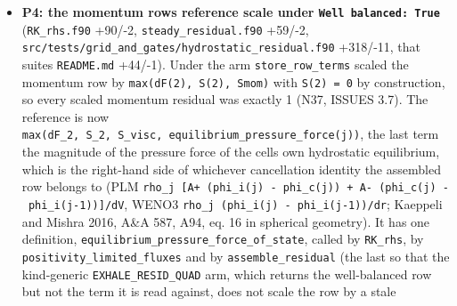 \documentclass[english,a4paper]{my_memo}
\begin{document}
\begin{itemize}
  \texttt{info\ =\ 0} log with no statement that the stop test read the certified rows;
  a refusal at return with no stop statement) and GREEN after;
  \texttt{certification} 57/0, \texttt{carrier\_returned\_state\_acceptance} 37/0,
  \texttt{attempted\_step} 71/0 unchanged. Impact: the \texttt{wasp\_full\_newton} reload ends
  \texttt{info\ =\ 0}, \texttt{\textbar{}\textbar{}R\textbar{}\textbar{}} 1.667e-09, flux spread 6.233e-14, 8 outer iterations,
  \texttt{log10\ Mdot} 13.30 on both binaries, the certification block line for line
  identical, every output byte-identical but the provenance line of the two
  \texttt{Hydro\_ioniz*} files and one extra \texttt{loop-top\ stop:} line in the log; the
  \texttt{carrier\_elem\_newton} reload at cap 40 gives every \texttt{(JFNK)} line identical
  because the gate is never met on that arm. No golden can move: READ from
  the ten \texttt{DEFAULT\_CASES}, none of their golden logs carries a \texttt{(JFNK)\ start}
  or \texttt{(PTC)\ start} line at all.
\item
  \textbf{P4: the momentum row\textquotesingle s reference scale under \texttt{Well\ balanced:\ True}}
  (\texttt{RK\_rhs.f90} +90/-2, \texttt{steady\_residual.f90} +59/-2,
  \texttt{src/tests/grid\_and\_gates/hydrostatic\_residual.f90} +318/-11, that suite\textquotesingle s
  \texttt{README.md} +44/-1). Under the arm \texttt{store\_row\_terms} scaled the momentum row by
  \texttt{max(\textbar{}dF(2)\textbar{},\ \textbar{}S(2)\textbar{},\ \textbar{}Smom\textbar{})} with \texttt{S(2)\ =\ 0} by construction, so every
  scaled momentum residual was exactly 1 (N37, ISSUES 3.7). The reference is
  now \texttt{max(\textbar{}dF\_2\textbar{},\ \textbar{}S\_2\textbar{},\ \textbar{}S\_visc\textbar{},\ equilibrium\_pressure\_force(j))}, the last
  term the magnitude of the pressure force of the cell\textquotesingle s own hydrostatic
  equilibrium, which is the right-hand side of whichever cancellation
  identity the assembled row belongs to (PLM
  \texttt{\textbar{}rho\_j\ {[}A+\ (phi\_i(j)\ -\ phi\_c(j))\ +\ A-\ (phi\_c(j)\ -\ phi\_i(j-1)){]}\textbar{}/dV}, WENO3
  \texttt{\textbar{}rho\_j\ (phi\_i(j)\ -\ phi\_i(j-1))\textbar{}/dr}; Kaeppeli and Mishra 2016, A\&A 587,
  A94, eq. 16 in spherical geometry). It has one definition,
  \texttt{equilibrium\_pressure\_force\_of\_state}, called by \texttt{RK\_rhs}, by
  \texttt{positivity\_limited\_fluxes} and by \texttt{assemble\_residual} (the last so that
  the kind-generic \texttt{EXHALE\_RESID\_QUAD} arm, which returns the well-balanced
  row but not the term it is read against, does not scale the row by a stale

\end{itemize}
\end{document}
